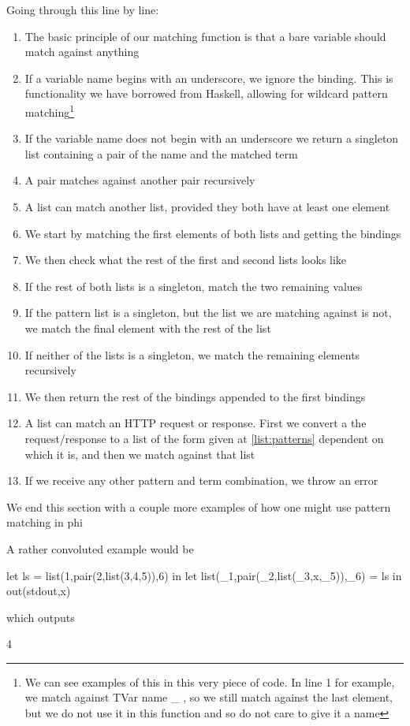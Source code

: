 Going through this line by line:
\begin{enumerate}
    \item The basic principle of our matching function is that a bare variable should match against anything
    \item If a variable name begins with an underscore, we ignore the binding. This is functionality we have borrowed from Haskell, allowing for wildcard pattern matching\footnote{We can see examples of this in this very piece of code. In line 1 for example, we match against TVar name \_ , so we still match against the last element, but we do not use it in this function and so do not care to give it a name}
    \item If the variable name does not begin with an underscore we return a singleton list containing a pair of the name and the matched term
    \item A pair matches against another pair recursively
    \item A list can match another list, provided they both have at least one element
    \item We start by matching the first elements of both lists and getting the bindings
    \item We then check what the rest of the first and second lists looks like   
    \item If the rest of both lists is a singleton, match the two remaining values
    \item If the pattern list is a singleton, but the list we are matching against is not, we match the final element with the rest of the list 
    \item If neither of the lists is a singleton, we match the remaining elements recursively
    \item We then return the rest of the bindings appended to the first bindings
    \item A list can match an HTTP request or response. First we convert a the request/response to a list of the form given at \ref{list:patterns} dependent on which it is, and then we match against that list
    \item If we receive any other pattern and term combination, we throw an error   
\end{enumerate}

We end this section with a couple more examples of how one might use pattern matching in phi

A rather convoluted example would be 
\begin{code}
let ls = list(1,pair(2,list(3,4,5)),6) in 
    let list(_1,pair(_2,list(_3,x,_5)),_6) = ls in 
        out(stdout,x)
\end{code}
which outputs
\begin{code}
    4
\end{code}

